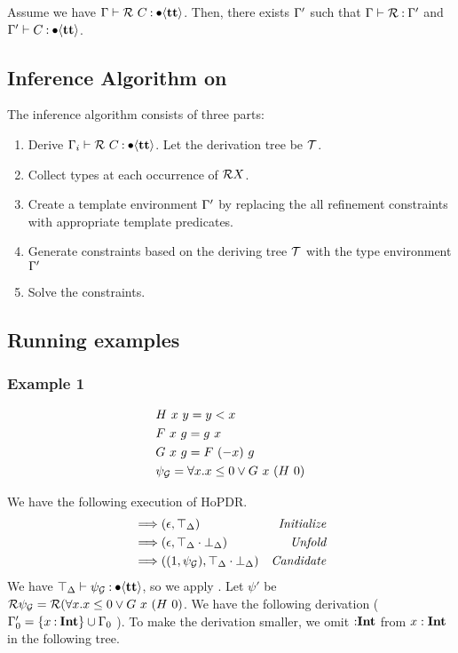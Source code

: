 \documentclass[acmsmall,review,anonymous]{acmart}\settopmatter{printfolios=true,printccs=false,printacmref=false}
\begin{document}
\begin{lemma}
Assume we have \( \Gamma \vdash \mathcal{R}\ C \mathbin{:} \bullet \langle \textbf{tt} \rangle \).
Then, there exists \( \Gamma' \) such that
\( \Gamma \vdash \mathcal{R} \mathbin{:} \Gamma' \) and \( \Gamma' \vdash C \mathbin{:} \bullet \langle \textbf{tt} \rangle \).
\end{lemma}

\subsection{Inference Algorithm on \rconflict{}}

The inference algorithm consists of three parts:
\begin{enumerate}
\item Derive \( \Gamma_i \vdash \mathcal{R}\ C \mathbin{:} \bullet \langle \textbf{tt} \rangle \). Let the derivation tree be \( \mathcal{T} \).
\item Collect types at each occurrence of \( \mathcal{R} X \).
\item Create a template environment \( \Gamma' \) by replacing the all refinement constraints with appropriate template predicates.
\item Generate constraints based on the deriving tree \( \mathcal{T} \) with the type environment \( \Gamma' \)
\item Solve the constraints.
\end{enumerate}

\subsection{Running examples}

\subsubsection{Example 1}

\begin{align*}
    &H\ x\ y = y < x \\
    &F\ x\ g = g\ x \\
    &G\ x\ g = F\ (-x)\ g  \\
    &\psi_{\mathcal{G}} = \forall x. x\leq 0 \vee G\ x\ (H\ 0)
\end{align*}

We have the following execution of HoPDR.
\begin{align*}
    &\Longrightarrow (\epsilon, \top_{\Delta}) &\emph{Initialize}\\
    &\Longrightarrow (\epsilon, \top_{\Delta} \cdot \bot_{\Delta}) &\emph{Unfold}\\
    &\Longrightarrow ((1, \psi_{\mathcal{G}}), \top_{\Delta} \cdot \bot_{\Delta}) &\emph{Candidate}\\
\end{align*}
We have \( \top_{\Delta} \vdash \psi_{\mathcal{G}} \mathbin{:} \bullet \langle \textbf{tt} \rangle \), so we apply \rconflict{}. Let \( \psi' \) be \( \mathcal{R} \psi_{\mathcal{G}} = \mathcal{R} (\forall x. x \leq 0 \lor G\ x\ (H\ 0) \). 
We have the following derivation
( \( \Gamma_0' = \{x \mathbin{:} \textbf{Int}\} \cup \Gamma_0 \) ).
To make the derivation smaller, we omit \( \mathbin{:} \textbf{Int} \) from \( {x} : \textbf{Int} \) in the following tree.
\end{document}

